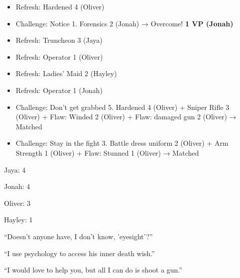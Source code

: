\begin{itemize}
\item Refresh: Hardened 4 (Oliver)
\item Challenge: Notice 1.  Forensics 2 (Jonah) → Overcome! \textbf{1 VP (Jonah)}
\item Refresh: Truncheon 3 (Jaya)
\item Refresh: Operator 1 (Oliver)
\item Refresh: Ladies' Maid 2 (Hayley)
\item Refresh: Operator 1 (Jonah)
\item Challenge: Don't get grabbed 5.  Hardened 4 (Oliver) + Sniper Rifle 3 (Oliver) +  {\color[RGB]{255,0,0}Flaw: Winded 2 (Oliver)}  +  {\color[RGB]{255,0,0}Flaw: damaged gun 2 (Oliver)}  → Matched
\item Challenge: Stay in the fight 3.  Battle dress uniform 2 (Oliver) + Arm Strength 1 (Oliver) +  {\color[RGB]{255,0,0}Flaw: Stunned 1 (Oliver)}  → Matched
\end{itemize}






{
\parskip=0pt
Jaya: 4

Jonah: 4

Oliver: 3

Hayley: 1
}






``Doesn't anyone have, I don't know, 'eyesight'?'' 




``I use psychology to access his inner death wish.'' 



``I would love to help you, but all I can do is shoot a gun.'' 


